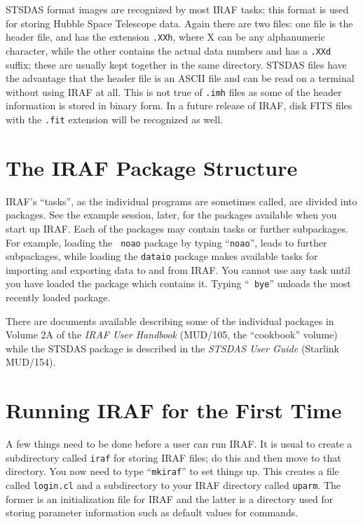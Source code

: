 STSDAS format images are recognized by most IRAF tasks;  this format is
used for storing Hubble Space Telescope data.  Again there are two
files:  one file is the
header file, and has the extension {\tt .XXh}, where X can be any
alphanumeric character, while the other contains the actual data
numbers and has a {\tt .XXd} suffix;  these are usually kept together
in the same directory. STSDAS files have the advantage that the header
file is an ASCII file and can be read on a terminal without using IRAF
at all. This is not true of {\tt .imh} files as some of the header
information is stored in binary form. In a future release of IRAF,
disk FITS files with the {\tt .fit} extension will be recognized as
well.

\section{The IRAF Package Structure}

IRAF's ``tasks'', as the individual programs are sometimes called,
are divided into packages. See the example session, later, for the
packages available when you start up IRAF. Each of the packages may
contain tasks or further subpackages. For example, loading the {\tt
noao} package by typing ``{\tt noao}'', leads to further subpackages,
while loading the {\tt dataio} package makes available tasks for
importing and exporting data to and from IRAF. You cannot use any task
until you have loaded the package which contains it. Typing ``{\tt
bye}'' unloads the most recently loaded package.

There are documents available describing some of the individual
packages in Volume 2A of the {\it IRAF User Handbook}\/ (MUD/105,
the ``cookbook'' volume) while the STSDAS package is described
in the {\it STSDAS User Guide}\/ (Starlink MUD/154).

\section{Running IRAF for the First Time}

A few things need to be done before a user can run IRAF. It is usual
to create a subdirectory called {\tt iraf} for storing IRAF files; do
this and then move to that directory. You now need to type ``{\tt mkiraf}'' to
set things up. This creates a file called {\tt login.cl} and a
subdirectory to your IRAF directory called {\tt uparm}. The former is
an initialization file for IRAF and the latter is a directory used for
storing parameter information such as default values for commands.


